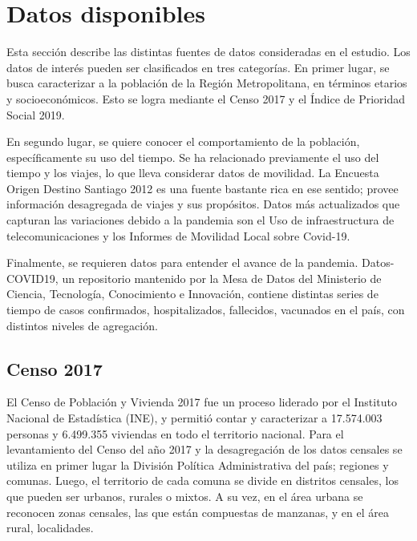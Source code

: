 \section{Datos disponibles}

Esta sección describe las distintas fuentes de datos consideradas en el estudio. Los datos de interés pueden ser clasificados en tres categorías. En primer lugar, se busca caracterizar a la población de la Región Metropolitana, en términos etarios y socioeconómicos. Esto se logra mediante el Censo 2017 y el Índice de Prioridad Social 2019.

En segundo lugar, se quiere conocer el comportamiento de la población, específicamente su uso del tiempo. Se ha relacionado previamente \cite{Munizaga2011}\cite{Kitamura1988}\cite{Axhausen1992} el uso del tiempo y los viajes, lo que lleva considerar datos de movilidad. La Encuesta Origen Destino Santiago 2012 es una fuente bastante rica en ese sentido; provee información desagregada de viajes y sus propósitos. Datos más actualizados que capturan las variaciones debido a la pandemia son el Uso de infraestructura de telecomunicaciones y los Informes de Movilidad Local sobre Covid-19.

Finalmente, se requieren datos para entender el avance de la pandemia. Datos-COVID19, un repositorio mantenido por la Mesa de Datos del Ministerio de Ciencia, Tecnología, Conocimiento e Innovación, contiene distintas series de tiempo de casos confirmados, hospitalizados, fallecidos, vacunados en el país, con distintos niveles de agregación.


\subsection{Censo 2017}

El Censo de Población y Vivienda 2017 fue un proceso liderado por el Instituto Nacional de Estadística (INE), y permitió contar y caracterizar a 17.574.003 personas y 6.499.355 viviendas en todo el territorio nacional.
Para el levantamiento del Censo del año 2017 y la desagregación de los datos censales se utiliza  en primer lugar la División Política Administrativa del país; regiones y comunas. Luego, el territorio de cada comuna se divide en distritos censales, los que pueden ser urbanos, rurales o mixtos. A su vez, en el área urbana se reconocen zonas censales, las que están compuestas de manzanas, y en el área rural, localidades.

